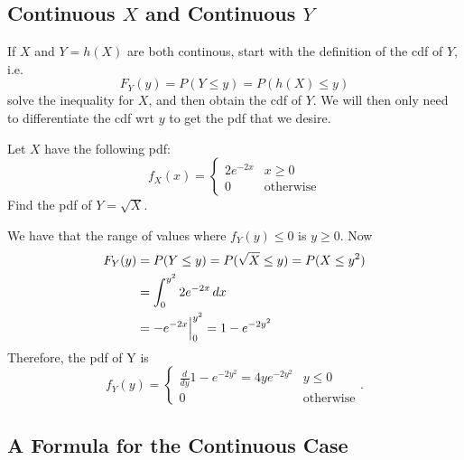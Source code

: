 \documentclass[notoc,notitlepage]{tufte-book}
\begin{document}

\subsection{Continuous $X$ and Continuous $Y$}%
\label{sub:continuous_x_and_continuous_y}

If $X$ and $Y= h(X)$ are both continous, start with the definition of the cdf of $Y$, i.e.
\begin{equation*}
  F_Y(y) = P(Y \leq y) = P(h(X) \leq y)
\end{equation*}
solve the inequality for $X$, and then obtain the cdf of $Y$. We will then only need to differentiate the cdf wrt $y$ to get the pdf that we desire.

\begin{eg}[Example 2.10]
  Let $X$ have the following pdf:
  \begin{equation*}
    f_X (x) = \begin{cases}
      2e^{-2x} & x \geq 0 \\
      0        & \text{otherwise}
    \end{cases}
  \end{equation*}
  Find the pdf of $Y = \sqrt{X}$.

  \begin{solution}
    We have that the range of values where $f_Y (y) \leq 0$ is $y \geq 0$. Now
    \begin{align*}
      F_Y(y) &= P(Y \leq y) = P(\sqrt{X} \leq y) = P(X \leq y^2) \\
             &= \int_{0}^{y^2} 2e^{-2x} \mathop{}\!d{x} \\
             &= -e^{-2x} \Big|_{0}^{y^2} = 1 - e^{-2y^2}
    \end{align*}
    Therefore, the pdf of Y is
    \begin{equation*}
      f_Y(y) = \begin{cases}
        \frac{d}{dy} 1 - e^{-2y^2} = 4ye^{-2y^2} & y \leq 0 \\
        0 & \text{otherwise}
      \end{cases}.
    \end{equation*}
  \end{solution}
\end{eg}


\subsection{A Formula for the Continuous Case}%
\label{sub:a_formula_for_the_continuous_case}
\end{document}
